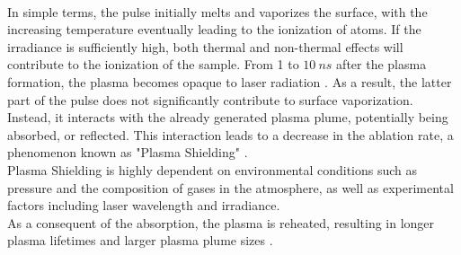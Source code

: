 \\
In simple terms, the pulse initially melts and vaporizes the surface, with the increasing temperature eventually leading to the ionization of atoms. If the irradiance is sufficiently high, both thermal and non-thermal effects will contribute to the ionization of the sample. From 1 to $10 \: ns$ after the plasma formation, the plasma becomes opaque to laser radiation \cite{anabitarteLaserInducedBreakdownSpectroscopy2012}. As a result, the latter part of the pulse does not significantly contribute to surface vaporization. Instead, it interacts with the already generated plasma plume, potentially being absorbed, or reflected. This interaction leads to a decrease in the ablation rate, a phenomenon known as "Plasma Shielding" \cite{vadilloEffectPlasmaShielding1999,aguileraPlasmaShieldingEffect1998}. 
\\
Plasma Shielding is highly dependent on environmental conditions such as pressure and the composition of gases in the atmosphere, as well as experimental factors including laser wavelength and irradiance.
\\
As a consequent of the absorption, the plasma is reheated, resulting in longer plasma lifetimes and larger plasma plume sizes \cite{angelLIBSUsingDual2001}.
